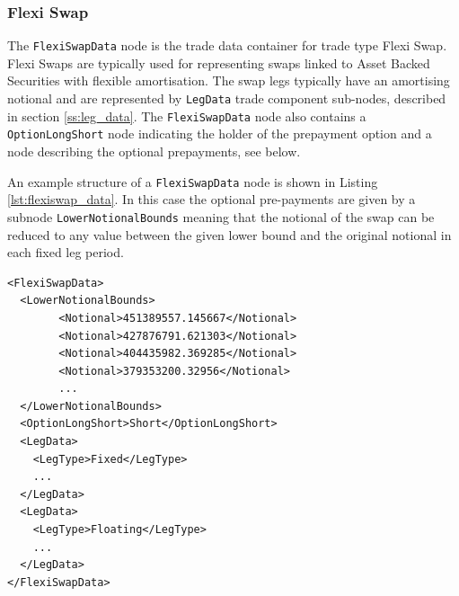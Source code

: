 \subsubsection{Flexi Swap}

\ifdefined{}\fi

The \lstinline!FlexiSwapData! node is the trade data container for trade type Flexi Swap. Flexi Swaps are typically used
for representing swaps linked to Asset Backed Securities with flexible amortisation.  The swap legs typically have an
amortising notional and are represented by \lstinline!LegData! trade component sub-nodes, described in
section \ref{ss:leg_data}. The \lstinline!FlexiSwapData!  node also contains a \lstinline!OptionLongShort! node
indicating the holder of the prepayment option and a node describing the optional prepayments, see below.

An example structure of a \lstinline!FlexiSwapData! node is shown in Listing \ref{lst:flexiswap_data}. In this case the
optional pre-payments are given by a subnode \lstinline!LowerNotionalBounds!  meaning that the notional of the swap can
be reduced to any value between the given lower bound and the original notional in each fixed leg period.

\begin{listing}[H]
\begin{verbatim}
<FlexiSwapData>
  <LowerNotionalBounds>
        <Notional>451389557.145667</Notional>
        <Notional>427876791.621303</Notional>
        <Notional>404435982.369285</Notional>
        <Notional>379353200.32956</Notional>
        ...
  </LowerNotionalBounds>
  <OptionLongShort>Short</OptionLongShort>
  <LegData>
    <LegType>Fixed</LegType>
    ...
  </LegData>
  <LegData>
    <LegType>Floating</LegType>
    ...
  </LegData>
</FlexiSwapData>
\end{verbatim}
\caption{Flexi Swap data}
\label{lst:flexiswap_data}
\end{listing}

